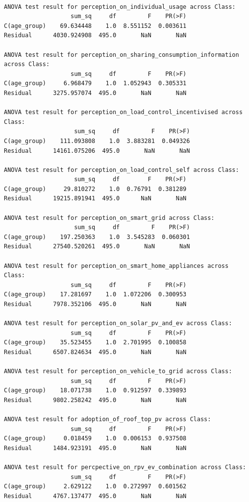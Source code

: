 \documentclass[
  letterpaper,
  DIV=11,
  numbers=noendperiod]{scrartcl}
\begin{document}
\begin{verbatim}

ANOVA test result for perception_on_individual_usage across Class:
                   sum_sq     df         F    PR(>F)
C(age_group)    69.634448    1.0  8.551152  0.003611
Residual      4030.924908  495.0       NaN       NaN

ANOVA test result for perception_on_sharing_consumption_information across Class:
                   sum_sq     df         F    PR(>F)
C(age_group)     6.968479    1.0  1.052943  0.305331
Residual      3275.957074  495.0       NaN       NaN

ANOVA test result for perception_on_load_control_incentivised across Class:
                    sum_sq     df         F    PR(>F)
C(age_group)    111.093808    1.0  3.883281  0.049326
Residual      14161.075206  495.0       NaN       NaN

ANOVA test result for perception_on_load_control_self across Class:
                    sum_sq     df        F    PR(>F)
C(age_group)     29.810272    1.0  0.76791  0.381289
Residual      19215.891941  495.0      NaN       NaN

ANOVA test result for perception_on_smart_grid across Class:
                    sum_sq     df         F    PR(>F)
C(age_group)    197.250363    1.0  3.545283  0.060301
Residual      27540.520261  495.0       NaN       NaN

ANOVA test result for perception_on_smart_home_appliances across Class:
                   sum_sq     df         F    PR(>F)
C(age_group)    17.281697    1.0  1.072206  0.300953
Residual      7978.352106  495.0       NaN       NaN

ANOVA test result for perception_on_solar_pv_and_ev across Class:
                   sum_sq     df         F    PR(>F)
C(age_group)    35.523455    1.0  2.701995  0.100858
Residual      6507.824634  495.0       NaN       NaN

ANOVA test result for perception_on_vehicle_to_grid across Class:
                   sum_sq     df         F    PR(>F)
C(age_group)    18.071738    1.0  0.912597  0.339893
Residual      9802.258242  495.0       NaN       NaN

ANOVA test result for adoption_of_roof_top_pv across Class:
                   sum_sq     df         F    PR(>F)
C(age_group)     0.018459    1.0  0.006153  0.937508
Residual      1484.923191  495.0       NaN       NaN

ANOVA test result for percpective_on_rpv_ev_combination across Class:
                   sum_sq     df         F    PR(>F)
C(age_group)     2.629122    1.0  0.272997  0.601562
Residual      4767.137477  495.0       NaN       NaN
\end{verbatim}
\end{document}
